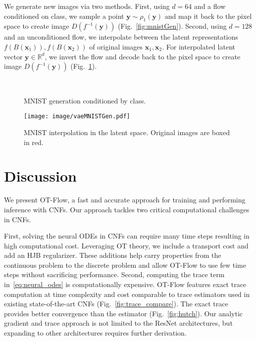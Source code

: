 \documentclass[letterpaper]{article}
\newcommand{\bfx}{\boldsymbol{x}}
\newcommand{\bfy}{\boldsymbol{y}}
\newcommand{\model}{OT-Flow} %
\newcommand{\R}{\ensuremath{\mathds{R}}}
\begin{document}
	We generate new images via two methods. First, using $d{=}64$ and a flow conditioned on class, we sample a point $\bfy \sim \rho_1(\bfy)$ and map it back to the pixel space to create image $D(f^{-1}(\bfy))$ (Fig.~\ref{fig:mnistGen}). Second, using $d{=}128$ and an unconditioned flow, we interpolate between the latent representations $f(B(\bfx_1)),f(B(\bfx_2))$ of original images $\bfx_1,\bfx_2$. For interpolated latent vector $\bfy \in \R^d$, we invert the flow and decode back to the pixel space to create image $D(f^{-1}(\bfy))$ (Fig.~\ref{fig:mnistVAE}).


\begin{figure}
    \centering
     \\
  \caption{MNIST generation conditioned by class.}
\end{figure}


\begin{figure}
    \centering
    \texttt{[image: image/vaeMNISTGen.pdf]}
  \caption{MNIST interpolation in the latent space. 
  Original images are boxed in red. }
  \label{fig:mnistVAE}
\end{figure}

\section{Discussion}

    We present \model{}, a fast and accurate approach for training and performing inference with CNFs. 
    Our approach tackles two critical computational challenges in CNFs. 
    
    First, solving the neural ODEs in CNFs can require many time steps resulting in high computational cost.
    Leveraging OT theory, we include a transport cost and add an HJB regularizer.
    These additions help carry properties from the continuous problem to the discrete problem and allow \model{} to use few time steps without sacrificing performance.
	Second, computing the trace term in~\eqref{eq:neural_odes} is computationally expensive.
	OT-Flow features exact trace computation at time complexity and cost comparable to trace estimators used in existing state-of-the-art CNFs (Fig.~\ref{fig:trace_compare}). The exact trace provides better convergence than the estimator (Fig.~\ref{fig:hutch}). 
	Our analytic gradient and trace approach is not limited to the ResNet architectures, but expanding to other architectures requires further derivation. 
\end{document}
